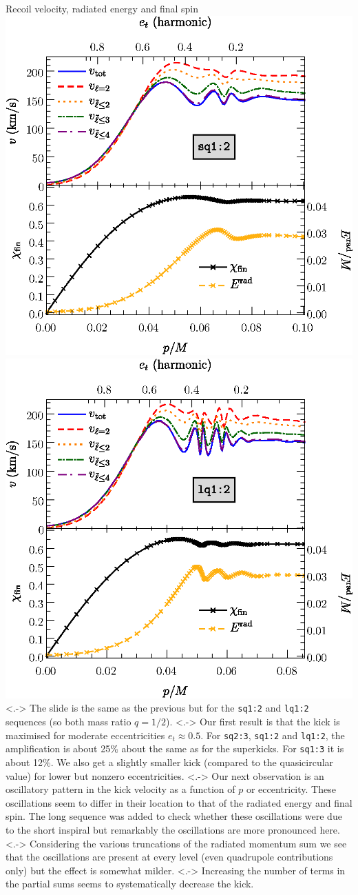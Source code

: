 \documentclass[smaller,aspectratio=169]{beamer}
\begin{document}
\begin{frame}{Recoil velocity, radiated energy and final spin}
	\includegraphics[width=0.45\linewidth]{kick-q2-wlabel.eps}
	\hfill
	\includegraphics[width=0.45\linewidth]{kick-q2l-wlabel.eps}
	\note[item]<.->{
        The slide is the same as the previous but for the \texttt{sq1:2} and
        \texttt{lq1:2} sequences (so both mass ratio $q=1/2$).}
    \note[item]<.->{
        Our first result is that the kick is maximised for moderate 
        eccentricities $e_t\approx 0.5$. For \texttt{sq2:3}, \texttt{sq1:2} and
        \texttt{lq1:2}, the amplification is about 25\% about the same as
        for the superkicks. For \texttt{sq1:3} it is about 12\%.
        We also get a slightly smaller kick (compared to the quasicircular 
        value) for lower but nonzero eccentricities.}
    \note[item]<.->{
        Our next observation is an oscillatory pattern in the kick velocity as 
        a function of $p$ or eccentricity. These oscillations seem to differ
        in their location to that of the radiated energy and final spin.
        The long sequence was added to check whether these oscillations were
        due to the short inspiral but remarkably the oscillations are more
        pronounced here.}
    \note[item]<.->{
        Considering the various truncations of the radiated momentum sum we see
        that the oscillations are present at every level (even quadrupole
        contributions only) but the effect is somewhat milder.}
    \note[item]<.->{
        Increasing the number of terms in the partial sums seems to 
        systematically decrease the kick.}
\end{frame}
\end{document}
